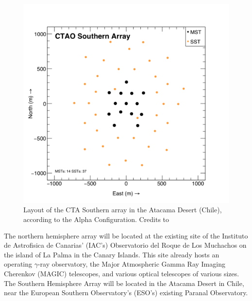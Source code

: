\begin{figure}[ht]
\centering
\includegraphics[width=0.8\linewidth]{figures/introduction/ctao-south.png}
\caption{Layout of the CTA Southern array in the Atacama Desert (Chile), according to the Alpha Configuration. Credits to \cite{zenodo_2021}}
\label{fig:ctao-south}
\end{figure}
The northern hemisphere array will be located at the existing site of the Instituto de Astrofisica de Canarias' (IAC's) Observatorio del Roque de Los Muchachos on the island of La Palma in the Canary Islands. This site already hosts an operating $\gamma$-ray observatory, the Major Atmospheric Gamma Ray Imaging Cherenkov (MAGIC) telescopes, and various optical telescopes of various sizes. The Southern Hemisphere Array will be located in the Atacama Desert in Chile, near the European Southern Observatory's (ESO's) existing Paranal Observatory. 

